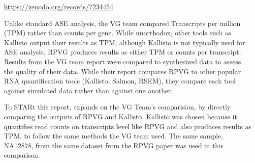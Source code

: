 \documentclass{article}
\begin{document}
\url{https://zenodo.org/records/7234454}

Unlike standard ASE analysis, the VG team compared Transcripts per million (TPM) rather than counts per gene.
While unorthodox, other tools such as Kallisto output their results as TPM, although Kallisto is not
typically used for ASE analysis. RPVG produces results as either TPM or counts per transcript. Results 
from the VG team report were compared to synthesized data to assess the quality of their data. 
While their report compares RPVG to other popular RNA quantification tools (Kallisto, Salmon, RSEM),
they compare each tool against simulated data rather than against one another. 

To STARt this report, expands on the VG Team's comparision, by directly comparing the outputs of 
RPVG and Kallisto. Kallisto was chosen because it quantifies read counts on transcripts level like RPVG
and also produces results as TPM, to follow the same methods the VG team used. The same sample, NA12878,
from the same dataset from the RPVG paper was used in this comparison.
\end{document}
